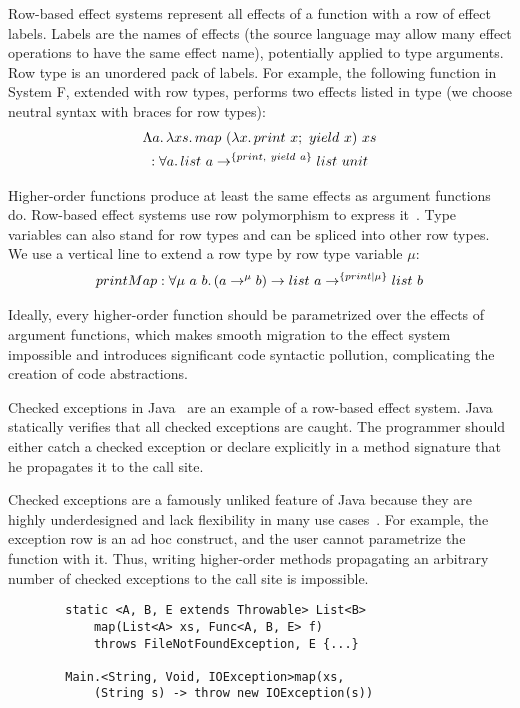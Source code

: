 \documentclass[conference]{IEEEtran}
\newcommand{\seq}{;~}
\newcommand{\ap}{~}
\begin{document}
    Row-based effect systems represent all effects of a function with a row of effect labels.
    Labels are the names of effects (the source language may allow many effect operations to have the same effect name), potentially applied to type arguments.
    Row type is an unordered pack of labels.
    For example, the following function in System F, extended with row types, performs two effects listed in type (we choose neutral syntax with braces for row types):
    \begin{multline*}
        \Lambda a\ldotp\lambda xs\ldotp map \ap (\lambda x\ldotp print\ap x\seq yield\ap x) \ap xs \\ : \forall a \ldotp list\ap a \to^{\{print, ~yield \ap a\}} list \ap unit
    \end{multline*}

    Higher-order functions produce at least the same effects as argument functions do.
    Row-based effect systems use row polymorphism to express it~\cite{gaster1996polymorphic}.
    Type variables can also stand for row types and can be spliced into other row types.
    We use a vertical line to extend a row type by row type variable $\mu$:
    \begin{multline*}
        printMap : \forall \mu \ap a \ap b\ldotp (a \to^\mu b) \to list \ap a \to^{\{print|\mu\}} list \ap b
    \end{multline*}

    Ideally, every higher-order function should be parametrized over the effects of argument functions, which makes smooth migration to the effect system impossible and introduces significant code syntactic pollution, complicating the creation of code abstractions.


    Checked exceptions in Java~\cite{gosling2000java} are an example of a row-based effect system.
    Java statically verifies that all checked exceptions are caught.
    The programmer should either catch a checked exception or declare explicitly in a method signature that he propagates it to the call site.

    Checked exceptions are a famously unliked feature of Java because they are highly underdesigned and lack flexibility in many use cases~\cite{checked-exceptions}.
    For example, the exception row is an ad hoc construct, and the user cannot parametrize the function with it.
    Thus, writing higher-order methods propagating an arbitrary number of checked exceptions to the call site is impossible.

    \begin{verbatim}
        static <A, B, E extends Throwable> List<B>
            map(List<A> xs, Func<A, B, E> f)
            throws FileNotFoundException, E {...}

        Main.<String, Void, IOException>map(xs,
            (String s) -> throw new IOException(s))
    \end{verbatim}
\end{document}

